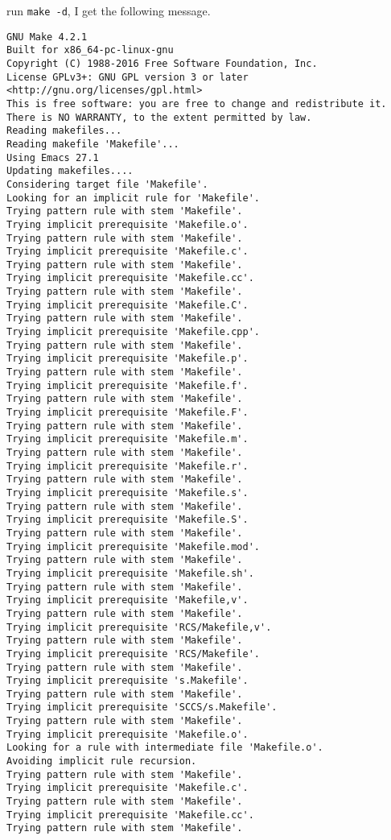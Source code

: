 \documentclass[11pt]{article}
\begin{document}
\begin{enumerate}
\begin{enumerate}
run \texttt{make -d}, I get the following message.
\begin{verbatim}
GNU Make 4.2.1
Built for x86_64-pc-linux-gnu
Copyright (C) 1988-2016 Free Software Foundation, Inc.
License GPLv3+: GNU GPL version 3 or later <http://gnu.org/licenses/gpl.html>
This is free software: you are free to change and redistribute it.
There is NO WARRANTY, to the extent permitted by law.
Reading makefiles...
Reading makefile 'Makefile'...
Using Emacs 27.1
Updating makefiles....
Considering target file 'Makefile'.
Looking for an implicit rule for 'Makefile'.
Trying pattern rule with stem 'Makefile'.
Trying implicit prerequisite 'Makefile.o'.
Trying pattern rule with stem 'Makefile'.
Trying implicit prerequisite 'Makefile.c'.
Trying pattern rule with stem 'Makefile'.
Trying implicit prerequisite 'Makefile.cc'.
Trying pattern rule with stem 'Makefile'.
Trying implicit prerequisite 'Makefile.C'.
Trying pattern rule with stem 'Makefile'.
Trying implicit prerequisite 'Makefile.cpp'.
Trying pattern rule with stem 'Makefile'.
Trying implicit prerequisite 'Makefile.p'.
Trying pattern rule with stem 'Makefile'.
Trying implicit prerequisite 'Makefile.f'.
Trying pattern rule with stem 'Makefile'.
Trying implicit prerequisite 'Makefile.F'.
Trying pattern rule with stem 'Makefile'.
Trying implicit prerequisite 'Makefile.m'.
Trying pattern rule with stem 'Makefile'.
Trying implicit prerequisite 'Makefile.r'.
Trying pattern rule with stem 'Makefile'.
Trying implicit prerequisite 'Makefile.s'.
Trying pattern rule with stem 'Makefile'.
Trying implicit prerequisite 'Makefile.S'.
Trying pattern rule with stem 'Makefile'.
Trying implicit prerequisite 'Makefile.mod'.
Trying pattern rule with stem 'Makefile'.
Trying implicit prerequisite 'Makefile.sh'.
Trying pattern rule with stem 'Makefile'.
Trying implicit prerequisite 'Makefile,v'.
Trying pattern rule with stem 'Makefile'.
Trying implicit prerequisite 'RCS/Makefile,v'.
Trying pattern rule with stem 'Makefile'.
Trying implicit prerequisite 'RCS/Makefile'.
Trying pattern rule with stem 'Makefile'.
Trying implicit prerequisite 's.Makefile'.
Trying pattern rule with stem 'Makefile'.
Trying implicit prerequisite 'SCCS/s.Makefile'.
Trying pattern rule with stem 'Makefile'.
Trying implicit prerequisite 'Makefile.o'.
Looking for a rule with intermediate file 'Makefile.o'.
Avoiding implicit rule recursion.
Trying pattern rule with stem 'Makefile'.
Trying implicit prerequisite 'Makefile.c'.
Trying pattern rule with stem 'Makefile'.
Trying implicit prerequisite 'Makefile.cc'.
Trying pattern rule with stem 'Makefile'.

\end{verbatim}
\end{enumerate}
\end{enumerate}
\end{document}
